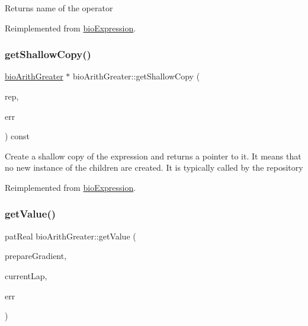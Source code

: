 \begin{DoxyReturn}{Returns}
name of the operator 
\end{DoxyReturn}


Reimplemented from \hyperlink{classbio_expression_a2353a4afb3a2b0af7c63aba086a72bde}{bio\+Expression}.

\mbox{\label{classbio_arith_greater_a73641032a8328db66db66469573ab61f}} 
\subsubsection{\texorpdfstring{get\+Shallow\+Copy()}{getShallowCopy()}}
{\footnotesize\ttfamily \hyperlink{classbio_arith_greater}{bio\+Arith\+Greater} $\ast$ bio\+Arith\+Greater\+::get\+Shallow\+Copy (\begin{DoxyParamCaption}\item[{\hyperlink{classbio_expression_repository}{bio\+Expression\+Repository} $\ast$}]{rep,  }\item[{pat\+Error $\ast$\&}]{err }\end{DoxyParamCaption}) const\hspace{0.3cm}{\ttfamily [virtual]}}

Create a shallow copy of the expression and returns a pointer to it. It means that no new instance of the children are created. It is typically called by the repository 

Reimplemented from \hyperlink{classbio_expression_a442534762693b92baaf33928979a1bf8}{bio\+Expression}.

\mbox{\label{classbio_arith_greater_ae486d20a8a8c6cfb1d287bb9de936ddb}} 
\subsubsection{\texorpdfstring{get\+Value()}{getValue()}}
{\footnotesize\ttfamily pat\+Real bio\+Arith\+Greater\+::get\+Value (\begin{DoxyParamCaption}\item[{pat\+Boolean}]{prepare\+Gradient,  }\item[{pat\+U\+Long}]{current\+Lap,  }\item[{pat\+Error $\ast$\&}]{err }\end{DoxyParamCaption})\hspace{0.3cm}{\ttfamily [virtual]}}

